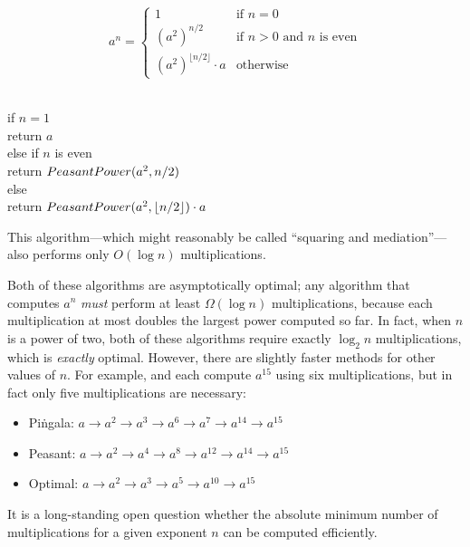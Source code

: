 \[
a^n = \begin{cases}
1 & \text{if } n = 0\\
(a^2)^{n/2} & \text{if } n > 0 \text{ and } n \text{ is even}\\
(a^2)^{\lfloor n/2\rfloor} \cdot a & \text{otherwise}
\end{cases}
\]
\begin{pseudocode}
\\
if $n = 1$\\
\Indent return $a$\\
else if $n$ is even\\
\Indent return $PeasantPower(a^2, n/2)$\\
else\\
\Indent return $PeasantPower(a^2, \lfloor n/2\rfloor) \cdot a$
\end{pseudocode}

\noindent This algorithm—which might reasonably be called “squaring and mediation”—also performs only $O(\log n)$ multiplications.

Both of these algorithms are asymptotically optimal; any algorithm that computes $a^n$ \emph{must} perform at least $\Omega(\log n)$ multiplications, because each multiplication at most doubles the largest power computed so far. In fact, when $n$ is a power of two, both of these algorithms require exactly $\log_2 n$ multiplications, which is \emph{exactly} optimal. However, there are slightly faster methods for other values of $n$. For example,  and  each compute $a^{15}$ using six multiplications, but in fact only five multiplications are necessary:
\begin{itemize}
\item Piṅgala: $a \to a^2 \to a^3 \to a^6 \to a^7 \to a^{14} \to a^{15}$
\item Peasant: $a \to a^2 \to a^4 \to a^8 \to a^{12} \to a^{14} \to a^{15}$
\item Optimal: $a \to a^2 \to a^3 \to a^5 \to a^{10} \to a^{15}$
\end{itemize}
It is a long-standing open question whether the absolute minimum number of multiplications for a given exponent $n$ can be computed efficiently.

